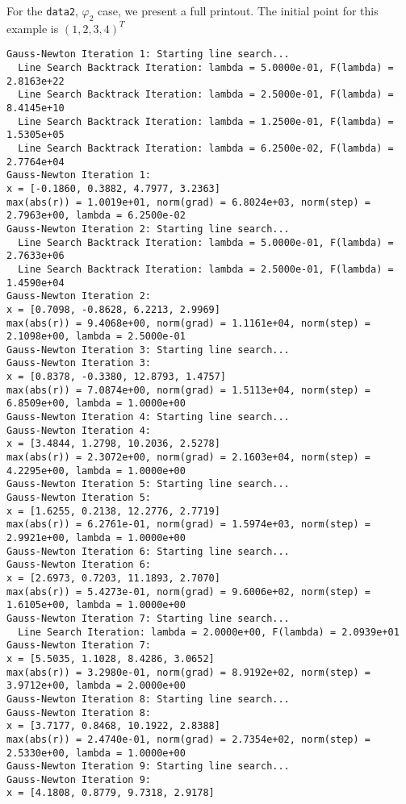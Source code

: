 \documentclass[12pt, a4paper]{article}
\newcommand{\bt}[1]{{\color{blue}{\textbf{#1}}}}
\newcommand{\bs}[1]{{\color{blue}{\boldsymbol{#1}}}}
\begin{document}
For the \texttt{data2}, $\varphi_2$ case, we present a full printout. The initial point for this example is ${(1,2,3,4)}^T$ \bt{and the tolerance is $\bs{10^{-4}}$.}
\scriptsize\begin{Verbatim}[frame=single, rulecolor=\color{blue}]
Gauss-Newton Iteration 1: Starting line search...
  Line Search Backtrack Iteration: lambda = 5.0000e-01, F(lambda) = 2.8163e+22
  Line Search Backtrack Iteration: lambda = 2.5000e-01, F(lambda) = 8.4145e+10
  Line Search Backtrack Iteration: lambda = 1.2500e-01, F(lambda) = 1.5305e+05
  Line Search Backtrack Iteration: lambda = 6.2500e-02, F(lambda) = 2.7764e+04
Gauss-Newton Iteration 1:
x = [-0.1860, 0.3882, 4.7977, 3.2363]
max(abs(r)) = 1.0019e+01, norm(grad) = 6.8024e+03, norm(step) = 2.7963e+00, lambda = 6.2500e-02
Gauss-Newton Iteration 2: Starting line search...
  Line Search Backtrack Iteration: lambda = 5.0000e-01, F(lambda) = 2.7633e+06
  Line Search Backtrack Iteration: lambda = 2.5000e-01, F(lambda) = 1.4590e+04
Gauss-Newton Iteration 2:
x = [0.7098, -0.8628, 6.2213, 2.9969]
max(abs(r)) = 9.4068e+00, norm(grad) = 1.1161e+04, norm(step) = 2.1098e+00, lambda = 2.5000e-01
Gauss-Newton Iteration 3: Starting line search...
Gauss-Newton Iteration 3:
x = [0.8378, -0.3380, 12.8793, 1.4757]
max(abs(r)) = 7.0874e+00, norm(grad) = 1.5113e+04, norm(step) = 6.8509e+00, lambda = 1.0000e+00
Gauss-Newton Iteration 4: Starting line search...
Gauss-Newton Iteration 4:
x = [3.4844, 1.2798, 10.2036, 2.5278]
max(abs(r)) = 2.3072e+00, norm(grad) = 2.1603e+04, norm(step) = 4.2295e+00, lambda = 1.0000e+00
Gauss-Newton Iteration 5: Starting line search...
Gauss-Newton Iteration 5:
x = [1.6255, 0.2138, 12.2776, 2.7719]
max(abs(r)) = 6.2761e-01, norm(grad) = 1.5974e+03, norm(step) = 2.9921e+00, lambda = 1.0000e+00
Gauss-Newton Iteration 6: Starting line search...
Gauss-Newton Iteration 6:
x = [2.6973, 0.7203, 11.1893, 2.7070]
max(abs(r)) = 5.4273e-01, norm(grad) = 9.6006e+02, norm(step) = 1.6105e+00, lambda = 1.0000e+00
Gauss-Newton Iteration 7: Starting line search...
  Line Search Iteration: lambda = 2.0000e+00, F(lambda) = 2.0939e+01
Gauss-Newton Iteration 7:
x = [5.5035, 1.1028, 8.4286, 3.0652]
max(abs(r)) = 3.2980e-01, norm(grad) = 8.9192e+02, norm(step) = 3.9712e+00, lambda = 2.0000e+00
Gauss-Newton Iteration 8: Starting line search...
Gauss-Newton Iteration 8:
x = [3.7177, 0.8468, 10.1922, 2.8388]
max(abs(r)) = 2.4740e-01, norm(grad) = 2.7354e+02, norm(step) = 2.5330e+00, lambda = 1.0000e+00
Gauss-Newton Iteration 9: Starting line search...
Gauss-Newton Iteration 9:
x = [4.1808, 0.8779, 9.7318, 2.9178]

\end{Verbatim}
\end{document}
